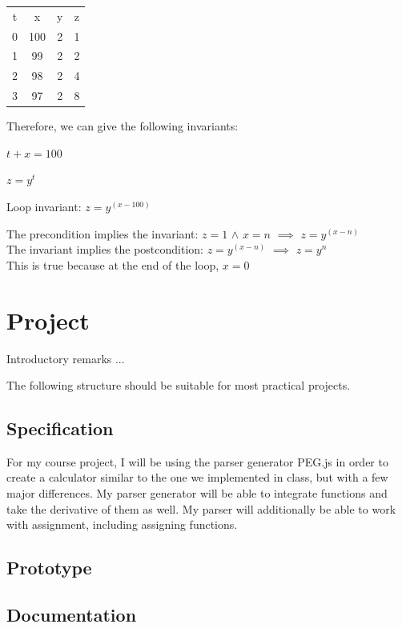 \documentclass{article}
\theoremstyle{theorem}
\theoremstyle{definition}
\theoremstyle{remark}
\begin{document}
\begin{tabular}{ |c|c|c|c| } 
 \hline
 t & x & y & z \\ 
 0 & 100 & 2 & 1 \\ 
 1 & 99 & 2 & 2 \\
 2 & 98 & 2 & 4 \\
 3 & 97 & 2 & 8 \\
 \hline
\end{tabular} \smallskip

Therefore, we can give the following invariants: \smallskip

$t+x=100$ \smallskip

$z=y^{t}$ \smallskip

Loop invariant: $z =y^{(x-100)}$ \smallskip

The precondition implies the invariant: \smallskip
$z=1$ $\wedge$ $x=n$
$\implies$ $z=y^{(x-n)}$ \\

The invariant implies the postcondition: \smallskip
$z=y^{(x-n)}$
$\implies$ $z=y^{n}$ \\ 

This is true because at the end of the loop, $x=0$

\section{Project}

Introductory remarks ...

The following structure should be suitable for most practical projects. 

\subsection{Specification}

For my course project, I will be using the parser generator PEG.js in order to create a calculator similar to the one we implemented in class, but with a few major differences. My parser generator will be able to integrate functions and take the derivative of them as well. My parser will additionally be able to work with assignment, including assigning functions.

\subsection{Prototype}
\subsection{Documentation}
\end{document}
